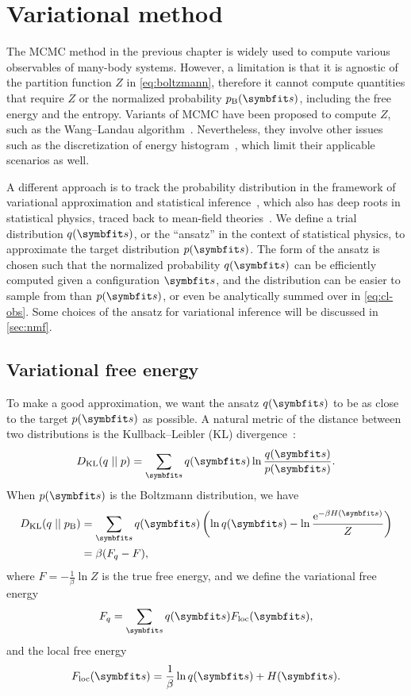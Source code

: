\chapter{Variational method}
\label{ch:cl-var}

The MCMC method in the previous chapter is widely used to compute various observables of many-body systems. However, a limitation is that it is agnostic of the partition function $Z$ in \cref{eq:boltzmann}, therefore it cannot compute quantities that require $Z$ or the normalized probability $p_\text{B}(\vs)$, including the free energy and the entropy. Variants of MCMC have been proposed to compute $Z$, such as the Wang--Landau algorithm~\cite{wang2001efficient, landau2021guide5}. Nevertheless, they involve other issues such as the discretization of energy histogram~\cite{belardinelli2007wang}, which limit their applicable scenarios as well.

A different approach is to track the probability distribution in the framework of variational approximation and statistical inference~\cite{jordan1999introduction, mackay2003information}, which also has deep roots in statistical physics, traced back to mean-field theories~\cite{chaikin1995principles4, zdeborova2016statistical}. We define a trial distribution $q(\vs)$, or the ``ansatz'' in the context of statistical physics, to approximate the target distribution $p(\vs)$. The form of the ansatz is chosen such that the normalized probability $q(\vs)$ can be efficiently computed given a configuration $\vs$, and the distribution can be easier to sample from than $p(\vs)$, or even be analytically summed over in \cref{eq:cl-obs}. Some choices of the ansatz for variational inference will be discussed in \cref{sec:nmf}.

\section{Variational free energy}

To make a good approximation, we want the ansatz $q(\vs)$ to be as close to the target $p(\vs)$ as possible. A natural metric of the distance between two distributions is the Kullback--Leibler (KL) divergence~\cite{kullback1951information}:
\begin{equation}
D_\text{KL}(q \mid\mid p) = \sum_\vs q(\vs) \ln \frac{q(\vs)}{p(\vs)}.
\end{equation}
When $p(\vs)$ is the Boltzmann distribution, we have
\begin{align}
D_\text{KL}(q \mid\mid p_\text{B}) &= \sum_\vs q(\vs) \left( \ln q(\vs) - \ln \frac{\rme^{-\beta H(\vs)}}{Z} \right) \\
&= \beta (F_q - F),
\label{eq:kl-fq}
\end{align}
where $F = -\frac{1}{\beta} \ln Z$ is the true free energy, and we define the variational free energy
\begin{equation}
F_q = \sum_\vs q(\vs) F_\text{loc}(\vs),
\label{eq:fq}
\end{equation}
and the local free energy
\begin{equation}
F_\text{loc}(\vs) = \frac{1}{\beta} \ln q(\vs) + H(\vs).
\label{eq:fq-loc}
\end{equation}

